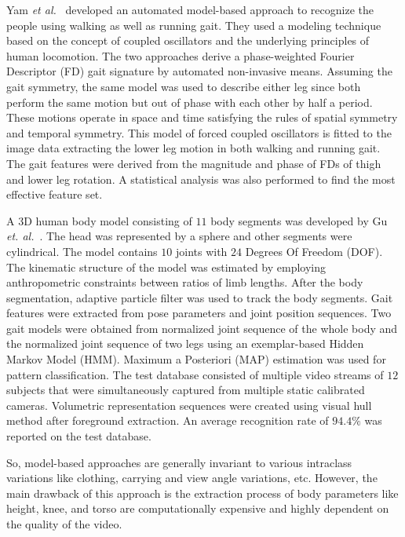 Yam \textit{et al.}~\cite{Yam_04} developed an automated model-based approach to recognize the people using walking as well as running gait. They used a modeling technique based on the concept of coupled oscillators and the underlying principles of human locomotion. The two approaches derive a phase-weighted Fourier Descriptor (FD) gait signature by automated non-invasive means. Assuming the gait symmetry, the same model was used to describe either leg since both perform the same motion but out of phase with each other by half a period. These motions operate in space and time satisfying the rules of spatial symmetry and temporal symmetry. This model of forced coupled oscillators is fitted to the image data extracting the lower leg motion in both walking and running gait. The gait features were derived from the magnitude and phase of FDs of thigh and lower leg rotation. A statistical analysis was also performed to find the most effective feature set. 


A 3D human body model consisting of $11$ body segments was developed by Gu \textit{et. al.}~\cite{Gu_10}. The head was represented by a sphere and other segments were cylindrical. The model contains $10$ joints with $24$ Degrees Of Freedom (DOF). The kinematic structure of the model was estimated by employing anthropometric constraints between ratios of limb lengths. After the body segmentation, adaptive particle filter was used to track the body segments. Gait features were extracted from pose parameters and joint position sequences. Two gait models were obtained from normalized joint sequence of the whole body and the normalized joint sequence of two legs using an exemplar-based Hidden Markov Model (HMM). Maximum a Posteriori (MAP) estimation was used for pattern classification. The test database consisted of multiple video streams of $12$ subjects that were simultaneously captured from multiple static calibrated cameras. Volumetric representation sequences were created using visual hull method after foreground extraction. An average recognition rate of $94.4\% $ was reported on the test database.

So, model-based approaches are generally invariant to various intraclass variations like clothing, carrying and view angle variations, etc. However, the main drawback of this approach is the extraction process of body parameters like height, knee, and torso are computationally expensive and highly dependent on the quality of the video.







